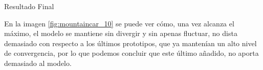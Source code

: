 %
       {Resultado Final}

En la imagen \ref{fig:mountaincar_10} se puede ver cómo, una vez alcanza el máximo, el modelo se mantiene sin divergir y sin apenas fluctuar, no dista demasiado con respecto a los últimos prototipos, que ya mantenían un alto nivel de convergencia, por lo que podemos concluir que este último añadido, no aporta demasiado al modelo. 

